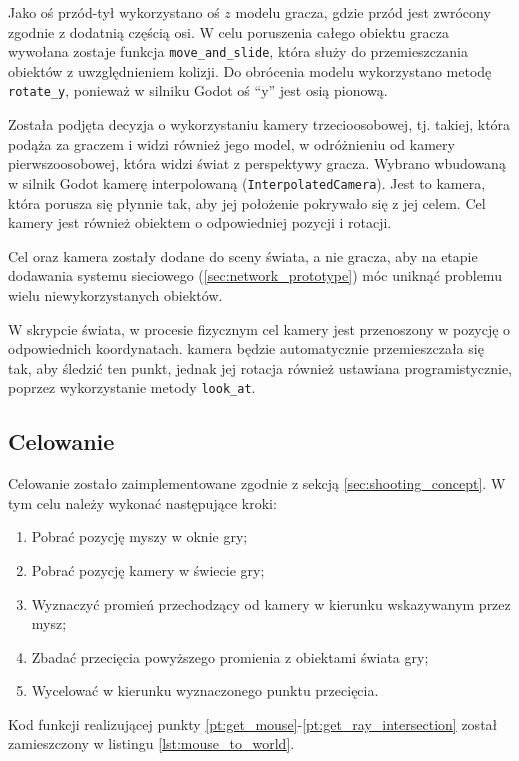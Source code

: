 Jako oś przód-tył wykorzystano oś $z$ modelu gracza, gdzie przód jest zwrócony zgodnie z dodatnią częścią osi. W celu poruszenia całego obiektu gracza wywołana zostaje funkcja \texttt{move\_and\_slide}, która służy do przemieszczania obiektów z uwzględnieniem kolizji. Do obrócenia modelu wykorzystano metodę \texttt{rotate\_y}, ponieważ w silniku Godot oś ``y'' jest osią pionową.

Została podjęta decyzja o wykorzystaniu kamery trzecioosobowej, tj. takiej, która podąża za graczem i widzi również jego model, w odróżnieniu od kamery pierwszoosobowej, która widzi świat z perspektywy gracza. Wybrano wbudowaną w silnik Godot kamerę interpolowaną (\texttt{InterpolatedCamera}). Jest to kamera, która porusza się płynnie tak, aby jej położenie pokrywało się z jej celem. Cel kamery jest również obiektem o odpowiedniej pozycji i rotacji.

Cel oraz kamera zostały dodane do sceny świata, a nie gracza, aby na etapie dodawania systemu sieciowego (\ref{sec:network_prototype}) móc uniknąć problemu wielu niewykorzystanych obiektów. 

W skrypcie świata, w procesie fizycznym cel kamery jest przenoszony w pozycję o odpowiednich koordynatach. kamera będzie automatycznie przemieszczała się tak, aby śledzić ten punkt, jednak jej rotacja również ustawiana programistycznie, poprzez wykorzystanie metody \texttt{look\_at}. 

\subsection{Celowanie}

Celowanie zostało zaimplementowane zgodnie z sekcją \ref{sec:shooting_concept}. W tym celu należy wykonać następujące kroki:
\begin{enumerate}
    \item\label{pt:get_mouse} Pobrać pozycję myszy w oknie gry;
    \item Pobrać pozycję kamery w świecie gry;
    \item Wyznaczyć promień przechodzący od kamery w kierunku wskazywanym przez mysz;
    \item\label{pt:get_ray_intersection} Zbadać przecięcia powyższego promienia z obiektami świata gry;
    \item Wycelować w kierunku wyznaczonego punktu przecięcia.  
\end{enumerate}

Kod funkcji realizującej punkty \ref{pt:get_mouse}-\ref{pt:get_ray_intersection} został zamieszczony w listingu \ref{lst:mouse_to_world}.

